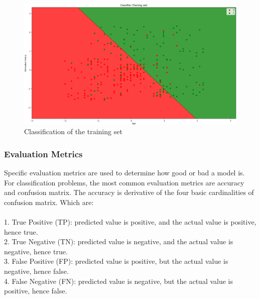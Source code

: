 \documentclass[conference]{IEEEtran}
\begin{document}
\begin{figure}[h]
    \centering
    \includegraphics[scale=0.23]{figs/classTraining.png}
    \caption{Classification of the training set}
    \label{dabc}        
\end{figure}

\subsubsection{Evaluation Metrics}
Specific evaluation metrics are used to determine how good or bad a model is. For classification problems, the most common evaluation metrics are accuracy and confusion matrix. The accuracy is derivative of the four basic cardinalities of confusion matrix. Which are:\\
\\
1. True Positive (TP): predicted value is positive, and the actual value is positive, hence true.\\
2. True Negative (TN): predicted value is negative, and the actual value is negative, hence true.\\
3. False Positive (FP): predicted value is positive, but the actual value is negative, hence false.\\
4. False Negative (FN): predicted value is negative, but the actual value is positive, hence false.\\
\end{document}
